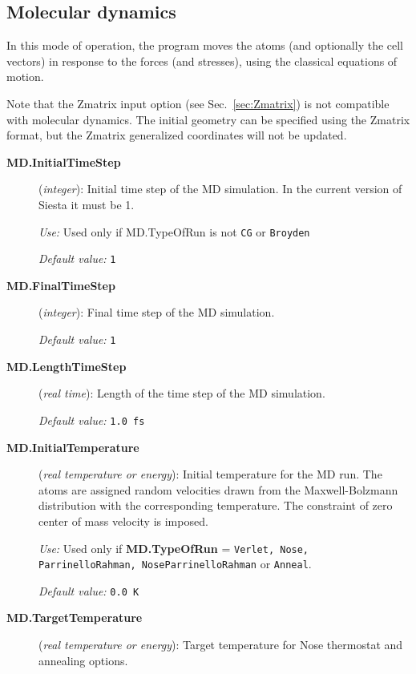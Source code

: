 \documentclass[11pt]{article}
\begin{document}
\subsection{Molecular dynamics}

In this mode of operation, the program moves the atoms (and optionally
the cell vectors) in response to the forces (and stresses), using the
classical equations of motion.

Note that the Zmatrix input option (see Sec.~\ref{sec:Zmatrix}) is not
compatible with molecular dynamics. The initial geometry can be
specified using the Zmatrix format, but the Zmatrix generalized
coordinates will not be updated.

\begin{description}
\item[{\bf MD.InitialTimeStep}] ({\it integer}):
Initial time step of the MD simulation.
In the current version of {\sc Siesta} it must be 1.

{\it Use:} Used only if MD.TypeOfRun is not {\tt CG} or {\tt Broyden}

{\it Default value:} {\tt 1}

\item[{\bf MD.FinalTimeStep}] ({\it integer}):
Final time step of the MD simulation.

{\it Default value:} {\tt 1}

\item[{\bf MD.LengthTimeStep}] ({\it real time}):
Length of the time step of the MD simulation.

{\it Default value:} {\tt 1.0 fs}

\item[{\bf MD.InitialTemperature}] ({\it real temperature or energy}):
Initial temperature for the MD run. The atoms are assigned random
velocities drawn from the Maxwell-Bolzmann distribution with the
corresponding temperature. The constraint of zero center of
mass velocity is imposed.

{\it Use:} Used only if {\bf MD.TypeOfRun} = {\tt Verlet, Nose,
ParrinelloRahman, NoseParrinelloRahman}
or {\tt Anneal}.

{\it Default value:} {\tt 0.0 K}


\item[{\bf MD.TargetTemperature}] ({\it real temperature or energy}):
Target temperature for Nose thermostat and annealing options.


\end{description}
\end{document}
